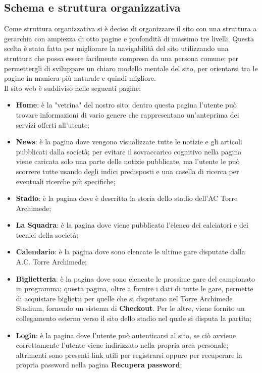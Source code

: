     \subsection{Schema e struttura organizzativa}
    Come struttura organizzativa si è deciso di organizzare il sito con una struttura a gerarchia con ampiezza di otto pagine e profondità di massimo tre livelli. Questa scelta è stata fatta per migliorare la navigabilità del sito utilizzando una struttura che possa essere facilmente compresa da una persona comune; per permettergli di sviluppare un chiaro modello mentale del sito, per orientarsi tra le pagine in maniera più naturale e quindi migliore.\\
    Il sito web è suddiviso nelle seguenti pagine:
    \begin{itemize}
        \item \textbf{Home}: è la "vetrina" del nostro sito; dentro questa pagina l'utente può trovare informazioni di vario genere che rappresentano un'anteprima dei servizi offerti all'utente;
        \item \textbf{News}: è la pagina dove vengono visualizzate tutte le notizie e gli articoli pubblicati dalla società; per evitare il sovraccarico cognitivo nella pagina viene caricata solo una parte delle notizie pubblicate, ma l'utente le può scorrere tutte usando degli indici predisposti e una casella di ricerca per eventuali ricerche più specifiche;
        \item \textbf{Stadio}: è la pagina dove è descritta la storia dello stadio dell'AC Torre Archimede;
        \item \textbf{La Squadra}: è la pagina dove viene pubblicato l'elenco dei calciatori e dei tecnici della società;
        \item \textbf{Calendario}: è la pagina dove sono elencate le ultime gare disputate dalla A.C. Torre Archimede;
        \item \textbf{Biglietteria}: è la pagina dove sono elencate le prossime gare del campionato in programma; questa pagina, oltre a fornire i dati di tutte le gare, permette di acquistare biglietti per quelle che si disputano nel Torre Archimede Stadium, fornendo un sistema di \textbf{Checkout}. Per le altre, viene fornito un collegamento esterno verso il sito dello stadio nel quale si disputa la partita;
        \item \textbf{Login}: è la pagina dove l'utente può autenticarsi al sito, se ciò avviene correttamente l'utente viene indirizzato nella propria area personale; altrimenti sono presenti link utili per registrarsi oppure per recuperare la propria password nella pagina \textbf{Recupera password};

\end{itemize}
